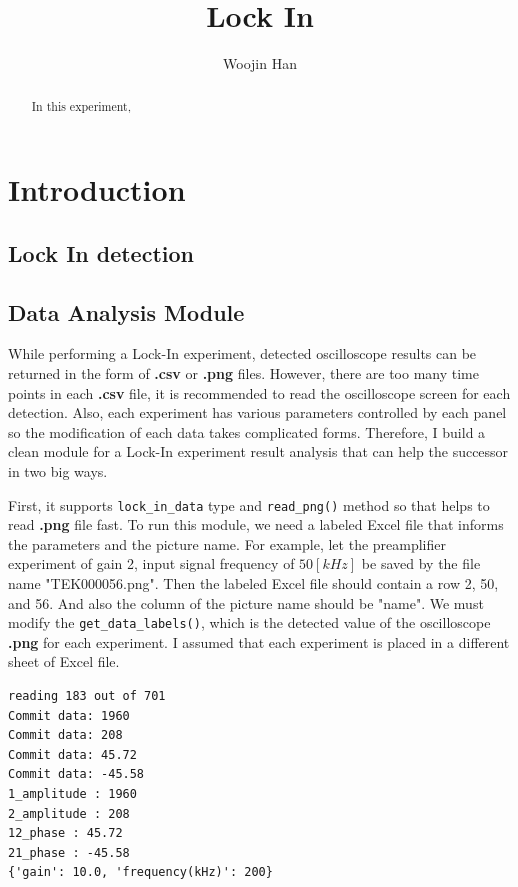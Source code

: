 \documentclass{article}
\begin{document}
\title{Lock In}
\author[1]{Woojin Han}
\maketitle

\begin{abstract}
    In this experiment,
\end{abstract}

\section{Introduction}

\subsection{Lock In detection}
\label{intro: lock_in_detection}
\subsection{Data Analysis Module}
 While performing a Lock-In experiment, detected oscilloscope results can be returned in the form of \textbf{.csv} or \textbf{.png} files.
 However, there are too many time points in each \textbf{.csv} file, it is recommended to read the oscilloscope screen for each detection.
 Also, each experiment has various parameters controlled by each panel so the modification of each data takes complicated forms.
 Therefore, I build a clean module for a Lock-In experiment result analysis that can help the successor in two big ways.

 First, it supports \verb|lock_in_data| type and \verb|read_png()| method so that helps to read \textbf{.png} file fast.
 To run this module, we need a labeled Excel file that informs the parameters and the picture name.
 For example, let the preamplifier experiment of gain 2, input signal frequency of $50  [kHz]$ be saved by the file name "TEK000056.png".
 Then the labeled Excel file should contain a row 2, 50, and 56.
 And also the column of the picture name should be "name".
 We must modify the \verb|get_data_labels()|, which is the detected value of the oscilloscope \textbf{.png} for each experiment.
 I assumed that each experiment is placed in a different sheet of Excel file.
 
 \begin{verbatim}
reading 183 out of 701
Commit data: 1960
Commit data: 208
Commit data: 45.72
Commit data: -45.58
1_amplitude : 1960
2_amplitude : 208
12_phase : 45.72
21_phase : -45.58
{'gain': 10.0, 'frequency(kHz)': 200}
 \end{verbatim}
 
\end{document}
